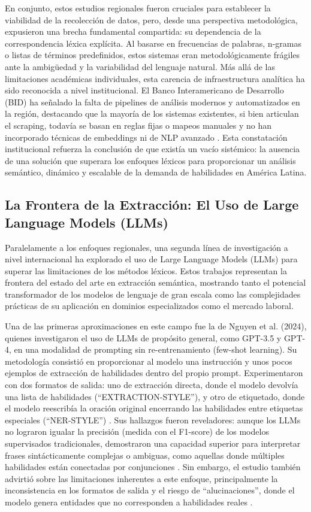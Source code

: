 En conjunto, estos estudios regionales fueron cruciales para establecer la viabilidad de la recolección de datos, pero, desde una perspectiva metodológica, expusieron una brecha fundamental compartida: su dependencia de la correspondencia léxica explícita. Al basarse en frecuencias de palabras, n-gramas o listas de términos predefinidos, estos sistemas eran metodológicamente frágiles ante la ambigüedad y la variabilidad del lenguaje natural. Más allá de las limitaciones académicas individuales, esta carencia de infraestructura analítica ha sido reconocida a nivel institucional. El Banco Interamericano de Desarrollo (BID) ha señalado la falta de pipelines de análisis modernos y automatizados en la región, destacando que la mayoría de los sistemas existentes, si bien articulan el scraping, todavía se basan en reglas fijas o mapeos manuales y no han incorporado técnicas de embeddings ni de NLP avanzado \cite{echeverria2022}. Esta constatación institucional refuerza la conclusión de que existía un vacío sistémico: la ausencia de una solución que superara los enfoques léxicos para proporcionar un análisis semántico, dinámico y escalable de la demanda de habilidades en América Latina.

\subsection{La Frontera de la Extracción: El Uso de Large Language Models (LLMs)}

Paralelamente a los enfoques regionales, una segunda línea de investigación a nivel internacional ha explorado el uso de Large Language Models (LLMs) para superar las limitaciones de los métodos léxicos. Estos trabajos representan la frontera del estado del arte en extracción semántica, mostrando tanto el potencial transformador de los modelos de lenguaje de gran escala como las complejidades prácticas de su aplicación en dominios especializados como el mercado laboral.

Una de las primeras aproximaciones en este campo fue la de Nguyen et al. (2024), quienes investigaron el uso de LLMs de propósito general, como GPT-3.5 y GPT-4, en una modalidad de prompting sin re-entrenamiento (few-shot learning). Su metodología consistió en proporcionar al modelo una instrucción y unos pocos ejemplos de extracción de habilidades dentro del propio prompt. Experimentaron con dos formatos de salida: uno de extracción directa, donde el modelo devolvía una lista de habilidades (``EXTRACTION-STYLE''), y otro de etiquetado, donde el modelo reescribía la oración original encerrando las habilidades entre etiquetas especiales (``NER-STYLE'') \cite{nguyen2024}. Sus hallazgos fueron reveladores: aunque los LLMs no lograron igualar la precisión (medida con el F1-score) de los modelos supervisados tradicionales, demostraron una capacidad superior para interpretar frases sintácticamente complejas o ambiguas, como aquellas donde múltiples habilidades están conectadas por conjunciones \cite{nguyen2024}. Sin embargo, el estudio también advirtió sobre las limitaciones inherentes a este enfoque, principalmente la inconsistencia en los formatos de salida y el riesgo de ``alucinaciones'', donde el modelo genera entidades que no corresponden a habilidades reales \cite{nguyen2024}.

